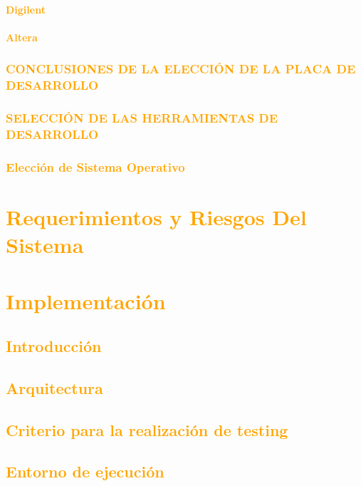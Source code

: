 \documentclass[a4paper,11pt]{article}
\begin{document}
			\paragraph{\textcolor{orange}{Digilent}} 	 
			\paragraph{\textcolor{orange}{Altera}}
 		\subsubsection{\textcolor{orange}{CONCLUSIONES DE LA ELECCIÓN DE LA PLACA DE DESARROLLO}}
 		\subsubsection{\textcolor{orange}{SELECCIÓN DE LAS HERRAMIENTAS DE DESARROLLO}} 	 
 		\subsubsection{\textcolor{orange}{Elección de Sistema Operativo}}
			
\section{\textcolor{orange}{Requerimientos y Riesgos Del Sistema}}

\section{\textcolor{orange}{Implementación}}
	\subsection{\textcolor{orange}{Introducción}}
	\subsection{\textcolor{orange}{Arquitectura}}
	\subsection{\textcolor{orange}{Criterio para la realización de testing}}
	\subsection{\textcolor{orange}{Entorno de ejecución}}
\end{document}
